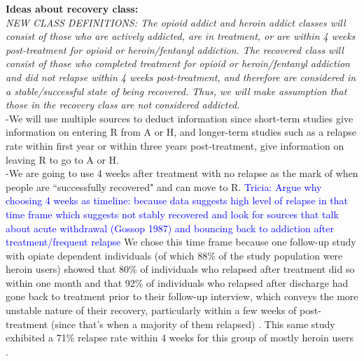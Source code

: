 \documentclass[12pt]{article}
\begin{document}
\noindent \textbf{Ideas about recovery class:} \\ 

\textit{NEW CLASS DEFINITIONS: The opioid addict and heroin addict classes will consist of those who are actively addicted, are in treatment, or are within 4 weeks post-treatment for opioid or heroin/fentanyl addiction. The recovered class will consist of those who completed treatment for opioid or heroin/fentanyl addiction and did not relapse within 4 weeks post-treatment, and therefore are considered in a stable/successful state of being recovered. Thus, we will make assumption that those in the recovery class are not considered addicted.}\\



-We will use multiple sources to deduct information since short-term studies give information on entering R from A or H, and longer-term studies such as a relapse rate within first year or within three years post-treatment, give information on leaving R to go to A or H. \\
-We are going to use 4 weeks after treatment with no relapse as the mark of when people are ``successfully recovered" and can move to R. \textcolor{blue}{Tricia: Argue why choosing 4 weeks as timeline: because data suggests high level of relapse in that time frame which suggests not stably recovered and look for sources that talk about acute withdrawal (Gossop 1987) and bouncing back to addiction after treatment/frequent relapse} We chose this time frame because one follow-up study with opiate dependent individuals (of which 88\% of the study population were heroin users) showed that 80\% of individuals who relapsed after treatment did so within one month and that 92\% of individuals who relapsed after discharge had gone back to treatment prior to their follow-up interview, which conveys the more unstable nature of their recovery, particularly within a few weeks of post-treatment (since that's when a majority of them relapsed) \cite{Smyth}. This same study exhibited a 71\% relapse rate within 4 weeks for this group of mostly heroin users \cite{Smyth}. 
\end{document}
